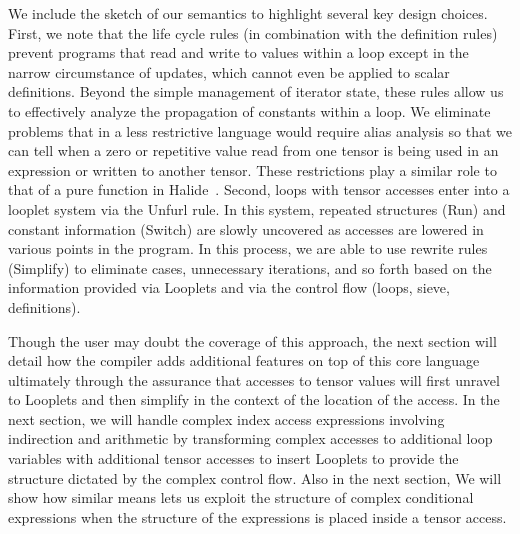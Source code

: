 We include the sketch of our semantics to highlight several key design choices.
%
First, we note that the life cycle rules (in combination with the definition rules) prevent programs that read and write to values within a loop except in the narrow circumstance of updates, which cannot even be applied to scalar definitions.
%
Beyond the simple management of iterator state, these rules allow us to effectively analyze the propagation of constants within a loop.
%
We eliminate problems that in a less restrictive language would require alias analysis so that we can tell when a zero or repetitive value read from one tensor is being used in an expression or written to another tensor.
%
These restrictions play a similar role to that of a pure function in Halide~\cite{ragan-kelley_halide_2013}.
%
Second, loops with tensor accesses enter into a looplet system via the Unfurl rule.
%
In this system, repeated structures (Run) and constant information (Switch)  are slowly uncovered as accesses are lowered in various points in the program.
%
In this process, we are able to use rewrite rules (Simplify) to eliminate cases, unnecessary iterations, and so forth based on the information provided via Looplets and via the control flow (loops, sieve, definitions).
%


Though the user may doubt the coverage of this approach, the next section will detail how the compiler adds additional features on top of this core language ultimately through the assurance that accesses to tensor values will first unravel to Looplets and then simplify in the context of the location of the access.
%
In the next section, we will handle complex index access expressions involving indirection and arithmetic by transforming complex accesses to additional loop variables with additional tensor accesses to insert Looplets to provide the structure dictated by the complex control flow.
%
Also in the next section, We will show how similar means lets us exploit the structure of complex conditional expressions when the structure of the expressions is placed inside a tensor access.





